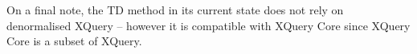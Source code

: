 On a final note, the TD method in its current state does not rely on
denormalised XQuery -- however it is compatible with XQuery Core since XQuery
Core is a subset of XQuery.

% 
